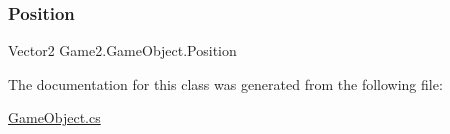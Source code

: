 \mbox{\label{class_game2_1_1_game_object_af5b0b48192336247e09d52a7fc6f56ad}} 
\subsubsection{\texorpdfstring{Position}{Position}}
{\footnotesize\ttfamily Vector2 Game2.\+Game\+Object.\+Position\hspace{0.3cm}{\ttfamily [get]}}



The documentation for this class was generated from the following file\+:\begin{DoxyCompactItemize}
\item 
\mbox{\hyperlink{_game_object_8cs}{Game\+Object.\+cs}}\end{DoxyCompactItemize}
